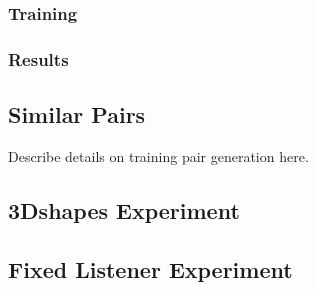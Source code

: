 \subsubsection{Training}
\subsubsection{Results}

\subsection{Similar Pairs}

Describe details on training pair generation here. 

\subsection{3Dshapes Experiment}

\subsection{Fixed Listener Experiment}